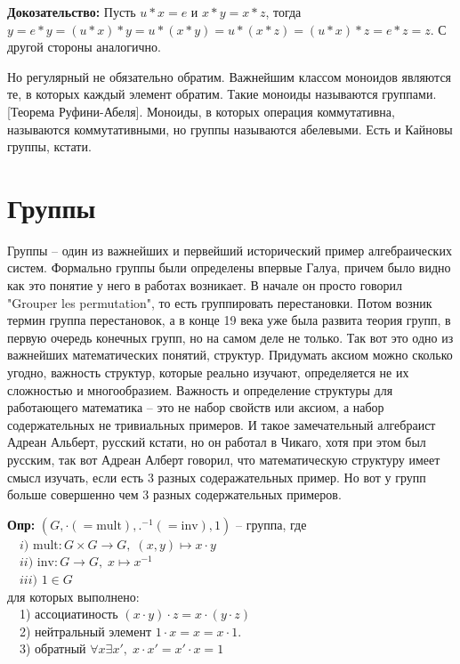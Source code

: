 \textbf{Докозательство:} Пусть $u*x=e$ и $x*y=x*z$, тогда $y=e*y=(u*x)*y=u*(x*y)=
u*(x*z)=(u*x)*z=e*z=z$. С другой стороны аналогично.

Но регулярный не обязательно обратим. Важнейшим классом моноидов являются те,
в которых каждый элемент обратим. Такие моноиды называются группами. [Теорема
Руфини-Абеля]. Моноиды, в которых операция коммутативна, называются
коммутативными, но группы называются абелевыми. Есть и Кайновы группы, кстати.

\section{Группы}
Группы – один из важнейших и первейший исторический пример алгебраических
систем. Формально группы были определены впервые Галуа, причем было видно как
это понятие у него в работах возникает. В начале он просто говорил "Grouper
les permutation", то есть группировать перестановки. Потом возник термин группа
перестановок, а в конце 19 века уже была развита теория групп, в первую очередь
конечных групп, но на самом деле не только. Так вот это одно из важнейших
математических понятий, структур. Придумать аксиом можно сколько угодно,
важность структур, которые реально изучают,  определяется не их сложностью и
многообразием. Важность и определение структуры для работающего математика –
это не набор свойств или аксиом, а набор содержательных не тривиальных примеров.
И такое замечательный алгебраист Адреан Альберт, русский кстати, но он работал
в Чикаго, хотя при этом был русским, так вот Адреан Алберт говорил, что
математическую структуру имеет смысл изучать, если есть 3 разных содеражательных
пример. Но вот у групп больше совершенно чем 3 разных содержательных примеров.

\textbf{Опр:} $(G,\cdot(=\text{mult}),.^{-1}(=\text{inv}),1)$ – группа, где\\
$\quad i)$ $\text{mult}: G\times G \longrightarrow G,\;(x,y)\mapsto x\cdot y$\\
$\quad ii)$ $\text{inv}: G\longrightarrow G,\;x\mapsto x^{-1}$\\
$\quad iii)$ $1\in G$\\
для которых выполнено:\\
$\quad$1) ассоциатиность $(x\cdot y)\cdot z=x\cdot (y\cdot z)$\\
$\quad$2) нейтральный элемент $1\cdot x = x = x\cdot 1$.\\
$\quad$3) обратный $\forall x\exists x',\;x\cdot x' = x'\cdot x = 1$


